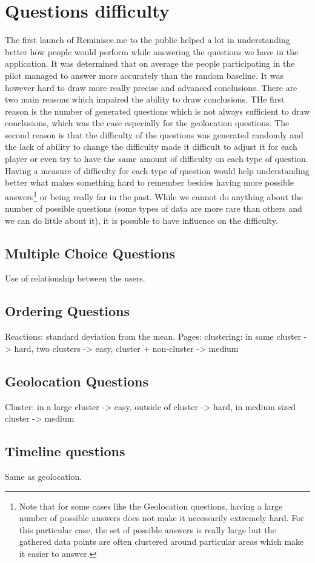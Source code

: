 \chapter{Questions difficulty}
The first launch of Reminisce.me to the public helped a lot in understanding better how people would perform while answering the questions we have in the application. It was determined that on average the people participating in the pilot managed to answer more accurately than the random baseline. It was however hard to draw more really precise and advanced conclusions. There are two main reasons which impaired the ability to draw conclusions. THe first reason is the number of generated questions which is not always sufficient to draw conclusions, which was the case especially for the geolocation questions. The second reason is that the difficulty of the questions was generated randomly and the lack of ability to change the difficulty made it difficult to adjust it for each player or even try to have the same amount of difficulty on each type of question. Having a measure of difficulty for each type of question would help understanding better what makes something hard to remember besides having more possible answers\footnote{Note that for some cases like the Geolocation questions, having a large number of possible answers does not make it necessarily extremely hard. For this particular case, the set of possible answers is really large but the gathered data points are often clustered around particular areas which make it easier to answer.} or being really far in the past. While we cannot do anything about the number of possible questions (some types of data are more rare than others and we can do little about it), it is possible to have influence on the difficulty.

\section{Multiple Choice Questions}
Use of relationship between the users.
\section{Ordering Questions}
Reactions: standard deviation from the mean.
Pages: clustering: in same cluster -> hard, two clusters -> easy, cluster + non-cluster -> medium
\section{Geolocation Questions}
Cluster: in a large cluster -> easy, outside of cluster -> hard, in medium sized cluster -> medium
\section{Timeline questions}
Same as geolocation.